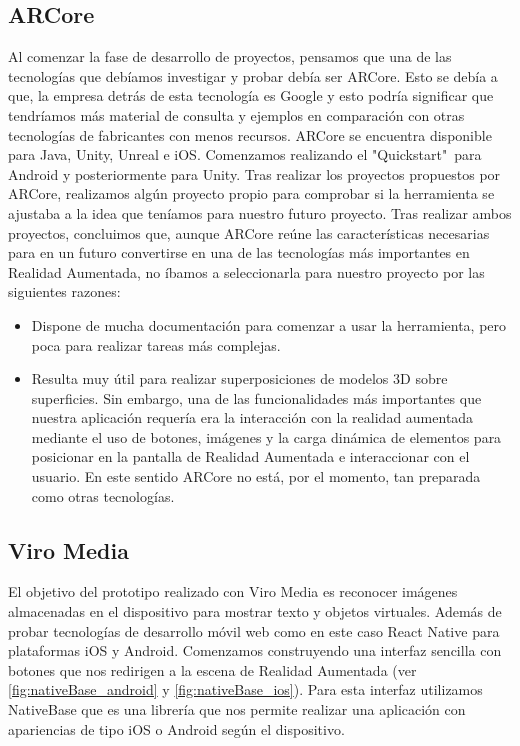 \subsection{ARCore} 
\label{makereference4.1.1} 
    Al comenzar la fase de desarrollo de proyectos, pensamos que una de las tecnologías que debíamos 
    investigar y probar debía ser ARCore. Esto se debía a que, la empresa detrás de esta 
    tecnología es Google y esto podría significar que tendríamos más material de consulta 
    y ejemplos en comparación con otras tecnologías de fabricantes con menos recursos.
    ARCore se encuentra disponible para Java, Unity, Unreal e iOS. Comenzamos realizando el 
    "Quickstart"\ para Android y posteriormente para Unity. 
    Tras realizar los proyectos propuestos por ARCore, realizamos algún proyecto propio 
    para comprobar si la herramienta se ajustaba a la idea que teníamos para nuestro futuro proyecto.
    Tras realizar ambos proyectos, concluimos que, aunque ARCore reúne las características 
    necesarias para en un futuro convertirse en una de las tecnologías más importantes en Realidad Aumentada, 
    no íbamos a seleccionarla para nuestro proyecto por las siguientes razones:
    \begin{itemize}
        \item Dispone de mucha documentación para comenzar a usar la herramienta, pero poca para realizar tareas más complejas.
        \item Resulta muy útil para realizar superposiciones de modelos 3D sobre superficies. Sin embargo, una de las funcionalidades más importantes que nuestra aplicación requería era la interacción con la realidad aumentada mediante el uso de botones, imágenes y la carga dinámica de elementos para posicionar en la pantalla de Realidad Aumentada e interaccionar con el usuario. En este sentido ARCore no está, por el momento, tan preparada como otras tecnologías.
    \end{itemize}
\subsection{Viro Media} 
\label{makereference4.1.2}

El objetivo del prototipo realizado con Viro Media es reconocer imágenes almacenadas en el dispositivo para mostrar texto y
objetos virtuales. Además de probar tecnologías de desarrollo móvil web como en este caso React Native
para plataformas iOS y Android. Comenzamos construyendo una interfaz sencilla con botones que nos redirigen a la escena de Realidad Aumentada (ver \autoref{fig:nativeBase_android} y \autoref{fig:nativeBase_ios}).
Para esta interfaz utilizamos NativeBase que es una librería que nos permite
realizar una aplicación con apariencias de tipo iOS o Android según el dispositivo.

